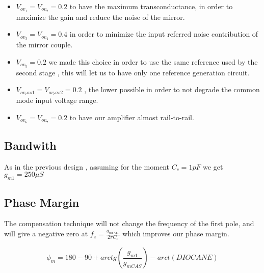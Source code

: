 \begin{itemize}
	\item $V_{ov_1}=V_{ov_2}=0.2$ to have the maximum transconductance, in order to maximize the gain and reduce the noise of the mirror.

	\item $V_{ov_3}=V_{ov_4}=0.4$ in order to minimize the input referred noise contribution of the mirror couple.

	\item $V_{ov_5}=0.2$ we made this choice in order to use the same reference used by the second stage , this will let us to have only one reference generation circuit.

	\item $V_{ov_cas1}=V_{ov_cas2}=0.2$ , the lower possible in order to not degrade the common mode input voltage range.

	\item $V_{ov_6}=V_{ov_7}=0.2$ to have our amplifier almost rail-to-rail.

\end{itemize}

\subsection{Bandwith} %
\label{sub:bandwith}

As in the previous design , assuming for the moment $C_c=1pF$ we get $g_{m1}= 250 \mu S$




\subsection{Phase Margin} %
\label{sub:phase_margin}

The compensation technique will not change the frequency of the first pole, and will give a negative zero at $f_z= 	\frac{g_{mCAS}}{2 \pi C_c}$ which improves our phase margin.

\begin{equation}
	\phi _m= 180 - 90 + arctg(\frac{g_{m1}}{g_{mCAS}}) - arct(DIOCANE)
\end{equation}



